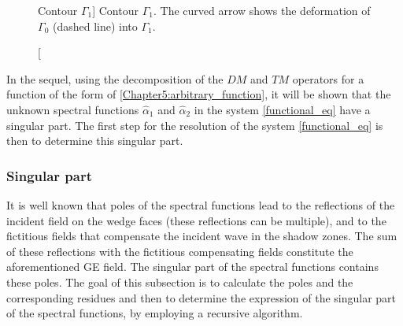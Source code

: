 \begin{figure}[ht]
\centering
{}
\caption
[Contour $\Gamma_1$]
{Contour $\Gamma_1$. The curved arrow shows the deformation of $\Gamma_0$ (dashed line) into $\Gamma_1$.}
\label{chapter5:figure5}
\end{figure}

In the sequel, using the decomposition of the $DM$ and $TM$ operators for a function of the form of \eqref{Chapter5:arbitrary_function}, it will be shown that the unknown spectral functions $\hat{\alpha}_1$ and $\hat{\alpha}_2$ in the system \eqref{functional_eq} have a singular part. The first step for the resolution of the system \eqref{functional_eq} is then to determine this singular part.

\subsubsection{Singular part}
\label{Chapter5:sing_part}

It is well known that poles of the spectral functions lead to the reflections of the incident field on the wedge faces (these reflections can be multiple), and to the fictitious fields that compensate the incident wave in the shadow zones. The sum of these reflections with the fictitious compensating fields constitute the aforementioned GE field. The singular part of the spectral functions contains these poles. The goal of this subsection is to calculate the poles and the corresponding residues and then to determine the expression of the singular part of the spectral functions, by employing a recursive algorithm. 

